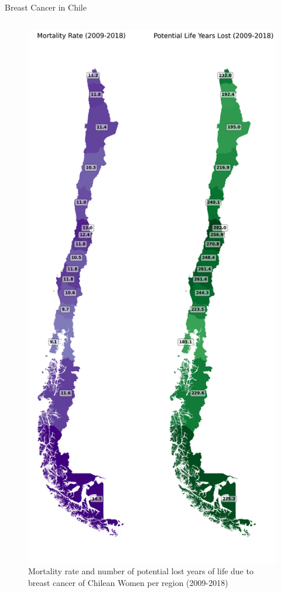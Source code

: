 \begin{frame}{Breast Cancer in Chile}
\begin{columns}
\begin{column}{0.4\textwidth}
\begin{figure}
                \includegraphics[height=0.5\textheight]{imagenes/mortalidad.png}
                \caption{Mortality rate and number of potential lost years of life due to breast cancer of Chilean Women per region (2009-2018)}
            \end{figure}
        \end{column}
    \end{columns}
        
\end{frame}

